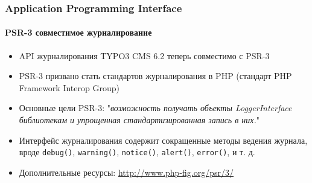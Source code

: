 \begin{frame}[fragile]
	\frametitle{Application Programming Interface}
	\framesubtitle{PSR-3 совместимое журналирование}

	\begin{itemize}
		\item API журналирования TYPO3 CMS 6.2 теперь совместимо с PSR-3
		\item PSR-3 призвано стать стандартов журналирования в PHP (стандарт PHP Framework Interop Group)

		\item Основные цели PSR-3:
			"\emph{возможность получать объекты LoggerInterface библиотекам и упрощенная стандартизированная запись в них.}"

		\item Интерфейс журналирования содержит сокращенные методы ведения журнала, вроде\newline
			\texttt{debug()}, \texttt{warning()}, \texttt{notice()}, \texttt{alert()}, \texttt{error()}, и т. д.

		\item Дополнительные ресурсы:\newline
			\url{http://www.php-fig.org/psr/3/}

	\end{itemize}

\end{frame}


